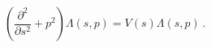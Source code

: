 \begin{equation}
\left( \frac{\partial ^{2}}{\partial s^{2}}+p^{2}\right) \Lambda \left(
s,p\right) =V\left( s\right) \Lambda \left( s,p\right) \,.  \label{ODE}
\end{equation}

